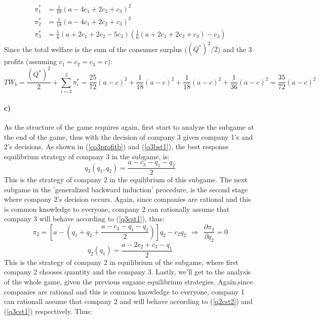 \documentclass[10pt,a4paper]{article}
\begin{document}
\begin{align*}
	\pi_1^* &= \frac{1}{18}(a-4 c_1+2 c_2+c_3)^2 \\
	\pi_2^* &= \frac{1}{18}(a-4 c_1+2 c_2+c_3)^2 \\
	\pi_3^* &= \frac16 (a+2 c_1+2 c_2-5 c_3) \left( \frac16 (a+2 c_1+2 c_2+c_3) -c_3 \right)
\end{align*}
Since the total welfare is the sum of the consumer surplus ($(Q^*)^2/2$) and the 3 profits (assuming $c_1=c_2=c_3=c$):
\begin{equation}
	TW_b = \frac{(Q^*)^2}{2} + \sum\limits_{i=3}^3 \pi^*_i = \frac{25}{72}(a-c)^2+\frac{1}{18}(a-c)^2+\frac{1}{18}(a-c)^2+\frac{1}{36}(a-c)^2=  \frac{35}{72} (a-c)^2
\end{equation}

\paragraph*{c)}
As the structure of the game requires again, first start to analyze the subgame at the end of the game, thus with the decision of company 3 given company 1's and 2's decisions. As shown in (\ref{co3profitb}) and (\ref{q3bst1}), the best response equilibrium strategy of company 3 in the subgame, is:
\begin{equation}
	\label{q3cst1}
	q_3(q_1,q_2) = \frac{a-c_3-q_1-q_2}{2}
\end{equation}
This is the strategy of company 2 in the equilibrium of this subgame.
The next subgame in the 'generalized backward induction' procedure, is the second stage where company 2's decision occurs. Again, since companies are rational and this is common knowledge to everyone, company 2 can rationally assume that company 3 will behave according to (\ref{q3cst1}), thus:
\begin{equation}
	\pi_2 = \left[a-\left(q_1+q_2+\frac{a-c_3-q_1-q_2}{2}\right)\right]q_2-c_2q_2 ~~ \Rightarrow ~~ \frac{\partial \pi_2}{\partial q_2} = 0
\end{equation}
\begin{equation}
	\label{q2cst2}
	q_2(q_1) = \frac{a-2 c_2+c_3-q_1}{2}
\end{equation}
This is the strategy of company 2 in equilibrium of the subgame, where first company 2 chooses quantity and the company 3. Lastly, we'll get to the analysis of the whole game, given the previous sugame equilibrium strategies. Again,since companies are rational and this is common knowledge to everyone, company 1 can rationall assume that company 2 and will behave according to (\ref{q2cst2}) and (\ref{q3cst1}) respectively. Thus:
\end{document}
